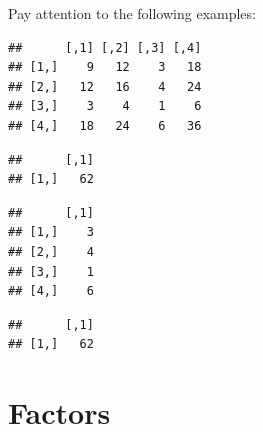 \documentclass[]{book}
\newenvironment{Shaded}{\begin{snugshade}}{\end{snugshade}}
\newcommand{\CommentTok}[1]{\textcolor[rgb]{0.56,0.35,0.01}{\textit{#1}}}
\newcommand{\DecValTok}[1]{\textcolor[rgb]{0.00,0.00,0.81}{#1}}
\newcommand{\KeywordTok}[1]{\textcolor[rgb]{0.13,0.29,0.53}{\textbf{#1}}}
\newcommand{\NormalTok}[1]{#1}
\newcommand{\OperatorTok}[1]{\textcolor[rgb]{0.81,0.36,0.00}{\textbf{#1}}}
\newcommand{\StringTok}[1]{\textcolor[rgb]{0.31,0.60,0.02}{#1}}
\begin{document}
Pay attention to the following examples:

\begin{Shaded}
\end{Shaded}

\begin{verbatim}
##      [,1] [,2] [,3] [,4]
## [1,]    9   12    3   18
## [2,]   12   16    4   24
## [3,]    3    4    1    6
## [4,]   18   24    6   36
\end{verbatim}

\begin{Shaded}
\end{Shaded}

\begin{verbatim}
##      [,1]
## [1,]   62
\end{verbatim}

\begin{Shaded}
\end{Shaded}

\begin{verbatim}
##      [,1]
## [1,]    3
## [2,]    4
## [3,]    1
## [4,]    6
\end{verbatim}

\begin{Shaded}
\end{Shaded}

\begin{verbatim}
##      [,1]
## [1,]   62
\end{verbatim}

\hypertarget{factors}{%
\section{Factors}\label{factors}}
\end{document}
